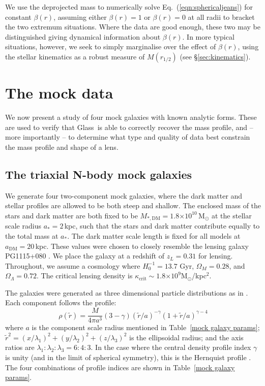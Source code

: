 \documentclass[galley,usenatbib]{mn2e}
\newcommand{\Glass}{{\sc Glass}}
\newcommand{\Mddd}{\ensuremath{M}}
\newcommand{\Msun}{\ensuremath{\mathrm{M}_\odot}}
\newcommand{\tabref}[1] {Table~\ref{#1}}
\newcommand{\eqnref}[1] {Eq.~(\ref{#1})}
\newcommand{\secref}[1] {\S\ref{#1}}
\newcommand{\e}[1]{\ensuremath{\times 10^{#1}}}
\begin{document}
We use the deprojected mass to numerically solve \eqnref{eqn:sphericaljeans}
for constant $\beta(r)$, assuming either $\beta(r) = 1$ or $\beta(r) = 0$ at
all radii to bracket the two extremum situations. Where the data are good
enough, these two may be distinguished giving dynamical information about
$\beta(r)$. In more typical situations, however, we seek to simply marginalise
over the effect of $\beta(r)$, using the stellar kinematics as a robust measure
of $\Mddd(r_{1/2})$ (see \secref{sec:kinematics}). 

\section{The mock data}\label{sec:mockdata}

We now present a study of four mock galaxies with known analytic forms. These
are used to verify that \Glass\ is able to correctly recover the mass profile,
and -- more importantly -- to determine what type and quality of data best
constrain the mass profile and shape of a lens.

\subsection{The triaxial N-body mock galaxies}

We generate four two-component mock galaxies, where the dark matter and stellar
profiles are allowed to be both steep and shallow.  The enclosed mass of the
stars and dark matter are both fixed to be $M_{*,\mathrm{DM}} =
1.8\e{10}$\,M$_\odot$ at the stellar scale radius $a_* = 2$\,kpc, such that the
stars and dark matter contribute equally to the total mass at $a_*$. The dark
matter scale length is fixed for all models at $a_\mathrm{DM} = 20$\,kpc.
These values were chosen to closely resemble the lensing galaxy PG1115+080
\citep{1980Natur.285..641W}. We place the galaxy at a redshift of $z_L = 0.31$
for lensing.  Throughout, we assume a cosmology where $H_0^{-1}=13.7$ Gyr,
$\Omega_M=0.28$, and $\Omega_\Lambda=0.72$. The critical lensing density is
$\kappa_\mathrm{crit}\sim 1.8\e{9}$\Msun/kpc$^2$.

The galaxies were generated as three dimensional particle distributions as in
\citet{2009MNRAS.395.1079D}. Each component follows the profile:
%
\begin{equation} 
  \rho(\tilde r) = \frac{M}{4\pi a^3}(3-\gamma){(\tilde r/a)^{-\gamma}(1 + \tilde r/a)^{\gamma-4}} 
  \label{Dehnen profile} 
\end{equation} 
%
where $a$ is the component scale radius mentioned in \tabref{mock galaxy
params}; $\tilde r^2 = (x/\lambda_1)^2 + (y/\lambda_2)^2 + (z/\lambda_3)^2$ is the
ellipsoidal radius; and the axis ratios are $\lambda_1:\lambda_2:\lambda_3 =
6:4:3$.  In the case where the central density profile index $\gamma$ is unity
(and in the limit of spherical symmetry), this is the Hernquist profile
\citep{1990ApJ...356..359H}.  The four combinations of profile indices are
shown in \tabref{mock galaxy params}.
\end{document}
